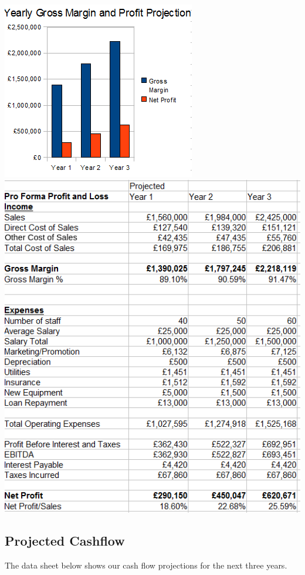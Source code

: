 \documentclass{article}
\begin{document}
\includegraphics[scale=1.0]{grossMarginAndProfitProjection.png}
\includegraphics[scale=1.0]{proFormaProfit3Years.png}

\subsection{Projected Cashflow}

The data sheet below shows our cash flow projections for the next three years.
\end{document}
